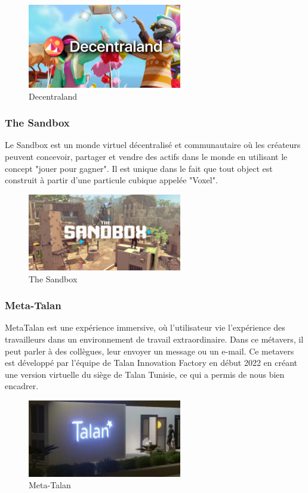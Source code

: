 \documentclass[12pt,a4paper,oneside,french]{book}
\begin{document}
\begin{figure}[H]
    \centering
    \includegraphics[width=0.6\textwidth]{figure/decentraland.png}
    \caption{Decentraland}
    \label{fig:decentraland}
\end{figure}
\noindent

\subsubsection*{The Sandbox}
Le Sandbox \cite{sandbox} est un monde virtuel décentralisé et communautaire où les créateurs peuvent
concevoir, partager et vendre des actifs dans le monde en utilisant le concept "jouer pour gagner". Il est unique dans le fait que tout object est construit à partir d'une particule cubique appelée "Voxel".
\begin{figure}[H]
    \centering
    \includegraphics[width=0.6\textwidth]{figure/sandbox.png}
    \caption{The Sandbox}
    \label{fig:sandbox}
\end{figure}
\noindent

\subsubsection*{Meta-Talan}
MetaTalan \cite{talan} est une expérience immersive, où l'utilisateur vie l'expérience des travailleurs dans un
environnement de travail extraordinaire. Dans ce métavers, il peut parler à des collègues,
leur envoyer un message ou un e-mail.
Ce metavers est développé par l'équipe de Talan Innovation Factory en début 2022 en créant une version virtuelle du siège de Talan Tunisie, ce qui a permis de nous bien encadrer.
\begin{figure}[H]
    \centering
    \includegraphics[width=0.6\textwidth]{figure/metatalan.png}
    \caption{Meta-Talan}
    \label{fig:metatalan}
\end{figure}
\noindent
\end{document}
